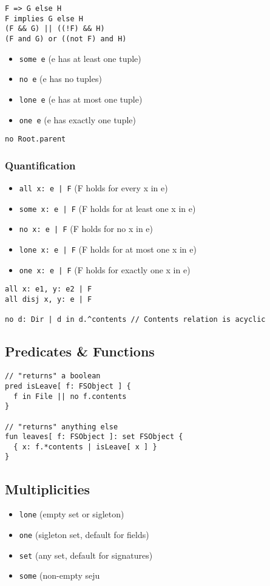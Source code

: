 \documentclass[11pt]{article}
\begin{document}
\begin{verbatim}
F => G else H
F implies G else H
(F && G) || ((!F) && H)
(F and G) or ((not F) and H)
\end{verbatim}

\begin{itemize}
\item \texttt{some e} (e has at least one tuple)
\item \texttt{no e} (e has no tuples)
\item \texttt{lone e} (e has at most one tuple)
\item \texttt{one e} (e has exactly one tuple)
\end{itemize}

\begin{verbatim}
no Root.parent
\end{verbatim}

\subsubsection{Quantification}
\label{sec:org27a3c41}

\begin{itemize}
\item \texttt{all x: e | F} (F holds for every x in e)
\item \texttt{some x: e | F} (F holds for at least one x in e)
\item \texttt{no x: e | F} (F holds for no x in e)
\item \texttt{lone x: e | F} (F holds for at most one x in e)
\item \texttt{one x: e | F} (F holds for exactly one x in e)
\end{itemize}

\begin{verbatim}
all x: e1, y: e2 | F
all disj x, y: e | F

no d: Dir | d in d.^contents // Contents relation is acyclic
\end{verbatim}

\subsection{Predicates \& Functions}
\label{sec:orgb4cb44e}

\begin{verbatim}
// "returns" a boolean
pred isLeave[ f: FSObject ] {
  f in File || no f.contents
}

// "returns" anything else
fun leaves[ f: FSObject ]: set FSObject {
  { x: f.*contents | isLeave[ x ] }
}
\end{verbatim}

\subsection{Multiplicities}
\label{sec:orgb96a83c}

\begin{itemize}
\item \texttt{lone} (empty set or sigleton)
\item \texttt{one} (sigleton set, default for fields)
\item \texttt{set} (any set, default for signatures)
\item \texttt{some} (non-empty seju
\end{itemize}
\end{document}
